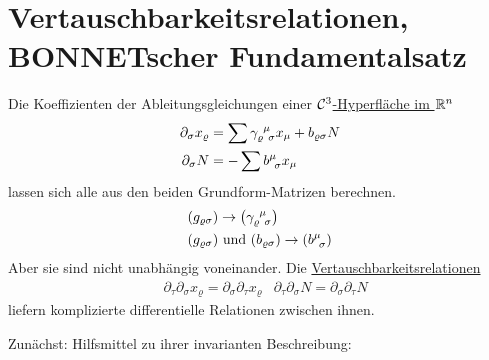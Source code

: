 \section{Vertauschbarkeitsrelationen, BONNETscher Fundamentalsatz}
Die Koeffizienten der Ableitungsgleichungen einer \uline{\(\mathcal{C}^3\)-Hyperfläche im \(\mathbb{R}^n\)}
\begin{align*}
 \partial_\sigma x_\varrho &= \sum \gamma_{\varrho \;\, \sigma}^{\;\, \mu} x_\mu + b_{\varrho \sigma} N \\
 \partial_\sigma N &= -\sum b^{\mu}_{\;\, \sigma} x_\mu
\end{align*}
lassen sich alle aus den beiden Grundform-Matrizen berechnen.
\begin{align*}
 &(g_{\varrho \sigma}) \to \left(\gamma_{\varrho \;\, \sigma}^{\;\, \mu} \right) \\
 &(g_{\varrho \sigma}) \text{ und } (b_{\varrho \sigma}) \to \left(b^{\mu}_{\;\, \sigma}\right)
\end{align*}
Aber sie sind nicht unabhängig voneinander. Die \uline{Vertauschbarkeitsrelationen}
\begin{align*}
 &\partial_\tau \partial_\sigma x_\varrho = \partial_\sigma \partial_\tau x_\varrho & \partial_\tau \partial_\sigma N = \partial_\sigma \partial_\tau N
\end{align*}
liefern komplizierte differentielle Relationen zwischen ihnen. \par
Zunächst: Hilfsmittel zu ihrer invarianten Beschreibung:
